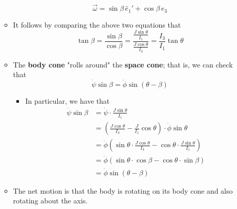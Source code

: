 \documentclass[../notes.tex]{subfiles}
\begin{document}
\begin{itemize}
\begin{itemize}
\begin{equation*}
            \vec{\omega} = \sin\beta\,\hat{e}_1'+\cos\beta\,\hat{e}_3
        \end{equation*}
        \item It follows by comparing the above two equations that
        \begin{equation*}
            \tan\beta = \frac{\sin\beta}{\cos\beta}
            = \frac{\frac{J\sin\theta}{I_1}}{\frac{J\cos\theta}{I_3}}
            = \frac{I_3}{I_1}\tan\theta
        \end{equation*}
        \item The \textbf{body cone} "rolls around" the \textbf{space cone}; that is, we can check that
        \begin{equation*}
            \dot{\psi}\sin\beta = \dot{\phi}\sin(\theta-\beta)
        \end{equation*}
        \begin{itemize}
            \item In particular, we have that
            \begin{align*}
                \dot{\psi}\sin\beta &= \dot{\psi}\cdot\frac{J\sin\theta}{I_1}\\
                &= \left( \frac{J\cos\theta}{I_3}-\frac{J}{I_1}\cos\theta \right)\cdot\dot{\phi}\sin\theta\\
                &= \dot{\phi}\left( \sin\theta\cdot\frac{J\cos\theta}{I_3}-\cos\theta\cdot\frac{J\sin\theta}{I_1} \right)\\
                &= \dot{\phi}(\sin\theta\cdot\cos\beta-\cos\theta\cdot\sin\beta)\\
                &= \dot{\phi}\sin(\theta-\beta)
            \end{align*}
        \end{itemize}
        \item The net motion is that the body is rotating on its body cone and also rotating about the axis.
    \end{itemize}
\end{itemize}
\end{document}
